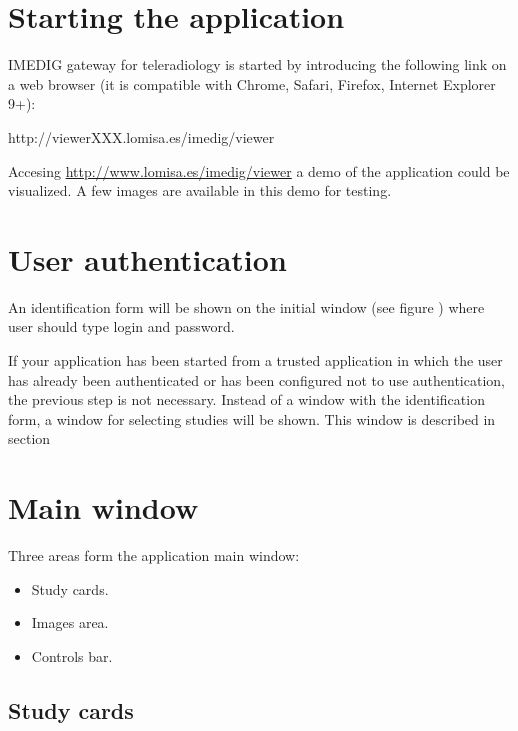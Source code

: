 \documentclass{plantilla-manual-usuario-en}
\begin{document}
\section{Starting the application}

IMEDIG gateway for teleradiology is started by introducing the following link on a web browser (it is compatible with Chrome, Safari, Firefox, Internet Explorer 9+):

http://viewerXXX.lomisa.es/imedig/viewer

Accesing \href{http://www.lomisa.es/imedig/viewer}{http://www.lomisa.es/imedig/viewer} a demo of the application could be visualized. A few images are available in this demo for testing.

\section{User authentication}

An identification form will be shown on the initial window (see figure ) where user should type login and password. 


If your application has been started from a trusted application in which the user has already been authenticated or has been configured not to use authentication, the previous step is not necessary. Instead of a window with the identification form, a window for selecting studies will be shown. This window is described in section 

\section{Main window}

Three areas form the application main window:

\begin{itemize}
\item Study cards.
\item Images area. 
\item Controls bar.
\end{itemize}


\subsection{Study cards}
\end{document}

